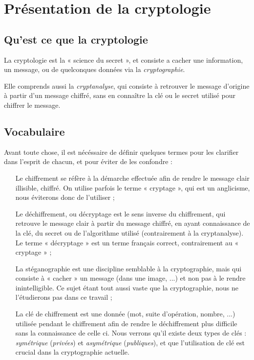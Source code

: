 \chapter{Présentation de la cryptologie}
\section{Qu'est ce que la cryptologie}
La cryptologie est la « science du secret », et consiste a cacher une
information, un message, ou de quelconques données via la
\emph{cryptographie}. 

Elle comprends aussi la \emph{cryptanalyse}, qui consiste à retrouver
le message d'origine à partir d'un message chiffré, sans en connaître
la clé ou le secret utilisé pour chiffrer le message.
\section{Vocabulaire\label{s:Definitions}}
Avant toute chose, il est nécéssaire de définir quelques termes pour
les clarifier dans l'esprit de chacun, et pour éviter de les confondre
:
\begin{itemize}
\renewcommand{\makelabel}[1]{\sffamily\textbf{#1}}
\item[Le chiffrement] se réfère à la démarche effectuée afin de rendre
  le message clair illisible, chiffré. On utilise parfois le terme
  « cryptage », qui est un anglicisme, nous éviterons donc de
  l'utiliser ;

\item[Le déchiffrement, ou décryptage] est le sens inverse du
  chiffrement, qui retrouve le message clair à partir du message
  chiffré, en ayant connaissance de la clé, du secret ou de
  l'algorithme utilisé (contrairement à la cryptanalyse). Le terme
  « décryptage » est un terme français correct, contrairement au
  « cryptage » ;

\item[La stéganographie] est une discipline semblable à la
  cryptographie, mais qui consiste à « cacher » un message (dans une
  image, ...) et non pas à le rendre inintelligible. Ce sujet étant
  tout aussi vaste que la cryptographie, nous ne l'étudierons pas dans
  ce travail ;

\item[La clé de chiffrement] est une donnée (mot, suite d'opération,
  nombre, ...) utilisée pendant le chiffrement afin de rendre le
  déchiffrement plus difficile sans la connaissance de celle ci.
  Nous verrons qu'il existe deux types de clés : \emph{symétrique}
  (\emph{privées}) et \emph{asymétrique} (\emph{publiques}), et que
  l'utilisation de clé est crucial dans la cryptographie actuelle.
\end{itemize}

